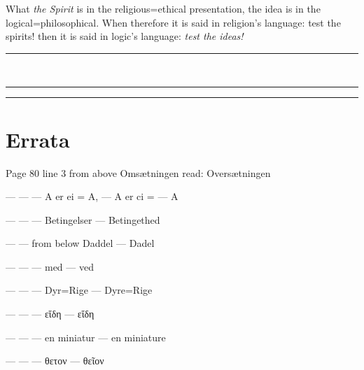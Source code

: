 \documentclass[12pt]{book}
\newcommand{\divrule}{\begin{center}%
  \rule{0.27\linewidth}{0.9pt}\\[1.6pt]\rule{0.22\linewidth}{0.4pt}\end{center}}
\begin{document}
What \emph{the Spirit} is in the religious=ethical presentation, the idea is
in the logical=philosophical. When therefore it is said in religion's
language: test the spirits! then it is said in logic's language:
\emph{test the ideas!}

\divrule

\begin{center}\rule{0.35\linewidth}{0.4pt}\end{center}

\cleardoublepage
\chapter*{Errata}
{\small\setlength{\parindent}{0pt}
Page 80 line 3 from above Omsætningen read: Oversætningen\par
---  \quad ---  \quad --- \quad A er ei = A, \quad --- \quad A er ci = --- A\par
---  \quad ---  \quad --- \quad Betingelser \quad --- \quad Betingethed\par
---  \quad ---  from below \quad Daddel \quad --- \quad Dadel\par
---  \quad ---  \quad --- \quad med \quad --- \quad ved\par
---  \quad ---  \quad --- \quad Dyr=Rige \quad --- \quad Dyre=Rige\par
---  \quad ---  \quad --- \quad εἵδη \quad --- \quad εἴδη\par
---  \quad ---  \quad --- \quad en miniatur \quad --- \quad en miniature\par
---  \quad ---  \quad --- \quad θετον \quad --- \quad θεῖον\par
}
\end{document}
